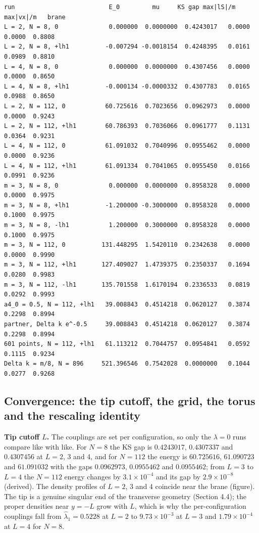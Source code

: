 \documentclass[11pt]{article}
\begin{document}
\begin{Verbatim}[fontsize=\small]
run                          E_0         mu     KS gap max|lS|/m max|vx|/m   brane
L = 2, N = 8, 0              0.000000  0.0000000  0.4243017   0.0000    0.0000  0.8808
L = 2, N = 8, +lh1          -0.007294 -0.0018154  0.4248395   0.0161    0.0989  0.8810
L = 4, N = 8, 0              0.000000  0.0000000  0.4307456   0.0000    0.0000  0.8650
L = 4, N = 8, +lh1          -0.000134 -0.0000332  0.4307783   0.0165    0.0988  0.8650
L = 2, N = 112, 0           60.725616  0.7023656  0.0962973   0.0000    0.0000  0.9243
L = 2, N = 112, +lh1        60.786393  0.7036066  0.0961777   0.1131    0.0364  0.9231
L = 4, N = 112, 0           61.091032  0.7040996  0.0955462   0.0000    0.0000  0.9236
L = 4, N = 112, +lh1        61.091334  0.7041065  0.0955450   0.0166    0.0991  0.9236
m = 3, N = 8, 0              0.000000  0.0000000  0.8958328   0.0000    0.0000  0.9975
m = 3, N = 8, +lh1          -1.200000 -0.3000000  0.8958328   0.0000    0.1000  0.9975
m = 3, N = 8, -lh1           1.200000  0.3000000  0.8958328   0.0000    0.1000  0.9975
m = 3, N = 112, 0          131.448295  1.5420110  0.2342638   0.0000    0.0000  0.9990
m = 3, N = 112, +lh1       127.409027  1.4739375  0.2350337   0.1694    0.0280  0.9983
m = 3, N = 112, -lh1       135.701558  1.6170194  0.2336533   0.0819    0.0292  0.9993
a4_0 = 0.5, N = 112, +lh1   39.008843  0.4514218  0.0620127   0.3874    0.2298  0.8994
partner, Delta k e^-0.5     39.008843  0.4514218  0.0620127   0.3874    0.2298  0.8994
601 points, N = 112, +lh1   61.113212  0.7044757  0.0954841   0.0592    0.1115  0.9234
Delta k = m/8, N = 896     521.396546  0.7542028  0.0000000   0.1044    0.0277  0.9268
\end{Verbatim}

\subsection{Convergence: the tip cutoff, the grid, the torus and the rescaling identity}

\textbf{Tip cutoff $L$.} The couplings are set per configuration, so only the $\lambda=0$ runs compare like with like. For $N=8$ the KS gap is $0.4243017$, $0.4307337$ and $0.4307456$ at $L=2$, 3 and 4, and for $N=112$ the energy is $60.725616$, $61.090723$ and $61.091032$ with the gaps $0.0962973$, $0.0955462$ and $0.0955462$; from $L=3$ to $L=4$ the $N=112$ energy changes by $3.1\times10^{-4}$ and its gap by $2.9\times10^{-8}$ (derived). The density profiles of $L=2$, 3 and 4 coincide near the brane (figure). The tip is a genuine singular end of the transverse geometry (Section 4.4); the proper densities near $y=-L$ grow with $L$, which is why the per-configuration couplings fall from $\hat\lambda_1=0.5228$ at $L=2$ to $9.73\times10^{-3}$ at $L=3$ and $1.79\times10^{-4}$ at $L=4$ for $N=8$.
\end{document}
